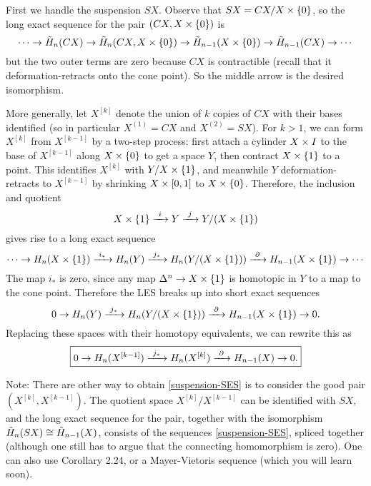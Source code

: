 
\soln First we handle the suspension $SX$.  Observe that $SX=CX/X\times\{0\}$, so the long exact sequence for the pair $(CX,X\times\{0\})$ is
\[\cdots\to\tilde H_n(CX)\to\tilde H_n(CX,X\times\{0\})\to\tilde H_{n-1}(X\times\{0\})\to\tilde H_{n-1}(CX)\to\cdots\]
but the two outer terms are zero because $CX$ is contractible (recall that it deformation-retracts onto the cone point).  So the middle arrow
is the desired isomorphism.

More generally, let $X^{[k]}$ denote the union of $k$ copies of $CX$ with their bases identified (so in particular $X^{(1)}=CX$ and $X^{(2)}=SX$).  For $k>1$, we can form $X^{[k]}$ from $X^{[k-1]}$ by a two-step process: first attach a cylinder $X\times I$ to the base of $X^{[k-1]}$ along $X\times\{0\}$ to get a space $Y$, then contract $X\times\{1\}$ to a point.  This identifies $X^{[k]}$ with $Y/X\times\{1\}$, and meanwhile $Y$ deformation-retracts to $X^{[k-1]}$ by shrinking $X\times[0,1]$ to $X\times\{0\}$.  Therefore, the inclusion and quotient
\[X\times\{1\} \xrightarrow{~i~} Y \xrightarrow{~j~} Y/(X\times\{1\})\]
gives rise to a long exact sequence
\[\cdots\to H_n(X\times\{1\}) \xrightarrow{~i_*~} H_n(Y) \xrightarrow{~j_*~} H_n(Y/(X\times\{1\})) \xrightarrow{~\partial~} H_{n-1}(X\times\{1\})\to\cdots\]
The map $i_*$ is zero, since any map $\Delta^n\to X\times\{1\}$ is homotopic in $Y$ to a map to the cone point.  Therefore the LES breaks up into short exact sequences
\[0\to H_n(Y) \xrightarrow{~j_*~} H_n(Y/(X\times\{1\})) \xrightarrow{~\partial~} H_{n-1}(X\times\{1\})\to 0.\]
Replacing these spaces with their homotopy equivalents, we can rewrite this as
\begin{equation} \label{suspension-SES}
\boxed{0 \to H_n(X^{[k-1]}) \xrightarrow{~j_*~} H_n(X^{[k]}) \xrightarrow{~\partial~} H_{n-1}(X)\to 0.}
\end{equation}

Note: There are other way to obtain \eqref{suspension-SES} is to consider the good pair $(X^{[k]},X^{[k-1]})$.  The quotient space $X^{[k]}/X^{[k-1]}$ can be identified with $SX$, and the long exact sequence for the pair, together with the isomorphism $\tilde H_n(SX)\cong \tilde H_{n-1}(X)$, consists of the sequences \eqref{suspension-SES}, spliced together (although one still has to argue that the connecting homomorphism is zero).  One can also use Corollary 2.24, or a Mayer-Vietoris sequence (which you will learn soon).


